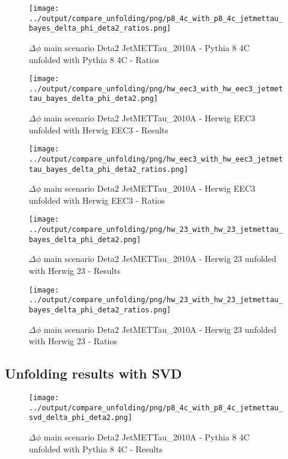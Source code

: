 \documentclass[11pt]{book}
\begin{document}
\begin{figure}[ht]
\centering
\texttt{[image: ../output/compare\_unfolding/png/p8\_4c\_with\_p8\_4c\_jetmettau\_bayes\_delta\_phi\_deta2\_ratios.png]}
\caption{$\Delta\phi$ main scenario Deta2 JetMETTau\_2010A - Pythia 8 4C unfolded with Pythia 8 4C - Ratios}
\label{p8_p8_jetmettau_bayes_delta_phi_deta2_b}
\end{figure}

\begin{figure}[ht]
\centering
\texttt{[image: ../output/compare\_unfolding/png/hw\_eec3\_with\_hw\_eec3\_jetmettau\_bayes\_delta\_phi\_deta2.png]}
\caption{$\Delta\phi$ main scenario Deta2 JetMETTau\_2010A - Herwig EEC3 unfolded with Herwig EEC3 - Results}
\label{hw_eec3_hw_eec3_jetmettau_bayes_delta_phi_deta2_a}
\end{figure}

\begin{figure}[ht]
\centering
\texttt{[image: ../output/compare\_unfolding/png/hw\_eec3\_with\_hw\_eec3\_jetmettau\_bayes\_delta\_phi\_deta2\_ratios.png]}
\caption{$\Delta\phi$ main scenario Deta2 JetMETTau\_2010A - Herwig EEC3 unfolded with Herwig EEC3 - Ratios}
\label{hw_eec3_hw_eec3_jetmettau_bayes_delta_phi_deta2_b}
\end{figure}

\begin{figure}[ht]
\centering
\texttt{[image: ../output/compare\_unfolding/png/hw\_23\_with\_hw\_23\_jetmettau\_bayes\_delta\_phi\_deta2.png]}
\caption{$\Delta\phi$ main scenario Deta2 JetMETTau\_2010A - Herwig 23 unfolded with Herwig 23 - Results}
\label{hw_23_hw_23_jetmettau_bayes_delta_phi_deta2_a}
\end{figure}

\begin{figure}[ht]
\centering
\texttt{[image: ../output/compare\_unfolding/png/hw\_23\_with\_hw\_23\_jetmettau\_bayes\_delta\_phi\_deta2\_ratios.png]}
\caption{$\Delta\phi$ main scenario Deta2 JetMETTau\_2010A - Herwig 23 unfolded with Herwig 23 - Ratios}
\label{hw_23_hw_23_jetmettau_bayes_delta_phi_deta2_b}
\end{figure}

\clearpage
\subsection{Unfolding results with SVD}
\begin{figure}[ht]
\centering
\texttt{[image: ../output/compare\_unfolding/png/p8\_4c\_with\_p8\_4c\_jetmettau\_svd\_delta\_phi\_deta2.png]}
\caption{$\Delta\phi$ main scenario Deta2 JetMETTau\_2010A - Pythia 8 4C unfolded with Pythia 8 4C - Results}
\label{p8_p8_jetmettau_svd_delta_phi_deta2_a}
\end{figure}
\end{document}
